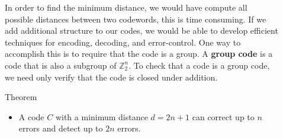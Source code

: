 \documentclass[final]{beamer}
\newcommand{\Z}{\mathbb{Z}}
\newlength{\sepwidth}
\newlength{\colwidth}
\newcommand{\separatorcolumn}{\begin{column}{\sepwidth}\end{column}}
\begin{document}
\begin{frame}[t]
\begin{columns}[t]
\begin{column}{\colwidth}


\end{column}

\separatorcolumn

\begin{column}{\colwidth}


  In order to find the minimum distance, we would have compute all possible distances between two codewords, 
  this is time consuming. If we add additional structure to our codes, we would be able 
  to develop efficient techniques for encoding, decoding, and 
  error-control. One way to accomplish this is to require that 
  the code is a group. A \textbf{group code} is a code that is 
  also a subgroup of $\Z_2^n$. To check that a code is a group 
  code, we need only verify that the code is closed under addition. 

  \vspace{6mm}

  \begin{alertblock}{Theorem}
    \begin{itemize}
      \item A code $C$ with a minimum distance $d = 2n+1$ can correct up to $n$ errors and detect up to $2n$ errors. 
            

\end{itemize}
\end{alertblock}
\end{column}
\end{columns}
\end{frame}
\end{document}
